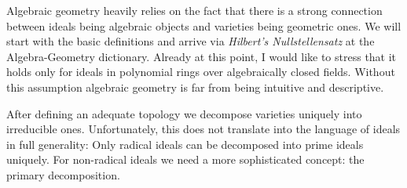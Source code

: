 \documentclass[11pt,a4paper]{scrreprt}
\begin{document}
\begin{abstractSection}
Algebraic geometry heavily relies on the fact that there is a strong connection between ideals being algebraic objects and varieties being geometric ones. We will start with the basic definitions and arrive via \emph{Hilbert's Nullstellensatz} at the Algebra-Geometry dictionary. Already at this point, I would like to stress that it holds only for ideals in polynomial rings over algebraically closed fields. Without this assumption algebraic geometry is far from being intuitive and descriptive.

After defining an adequate topology we decompose varieties uniquely into irreducible ones. Unfortunately, this does not translate into the language of ideals in full generality: Only radical ideals can be decomposed into prime ideals uniquely. For non-radical ideals we need a more sophisticated concept: the primary decomposition.
\end{abstractSection}
\end{document}
